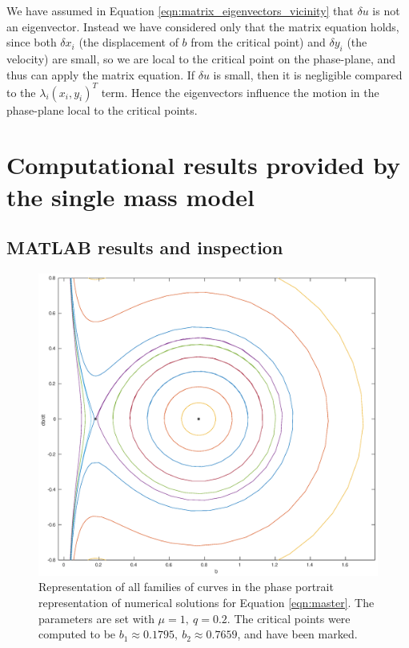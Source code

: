 \documentclass{article}
\begin{document}
We have assumed in Equation \ref{eqn:matrix_eigenvectors_vicinity} that $\delta u$ is not an eigenvector.
Instead we have considered only that the matrix equation holds,
since both $\delta x_i$ (the displacement of $b$ from the critical point)
and $\delta y_i$ (the velocity) are small, so we are local to the critical point on the phase-plane,
and thus can apply the matrix equation. If $\delta u$ is small, then it is negligible compared to the $\lambda_i (x_i,y_i)^T$ term.
Hence the eigenvectors influence the motion in the phase-plane local to the critical points. 

\section{Computational results provided by the single mass model}

\subsection{MATLAB results and inspection}

\begin{figure}
    \centering
    \includegraphics[width=\linewidth]{phaseportrait}
    \caption{Representation of all families of curves in the phase portrait representation of numerical solutions for Equation \ref{eqn:master}.
        The parameters are set with $\mu = 1,~q=0.2$. The critical points were computed to be $b_1 \approx 0.1795,~ b_2 \approx 0.7659$, and have been marked.
    }
    \label{fig:phaseportrait_oscillations}
\end{figure}
\end{document}
